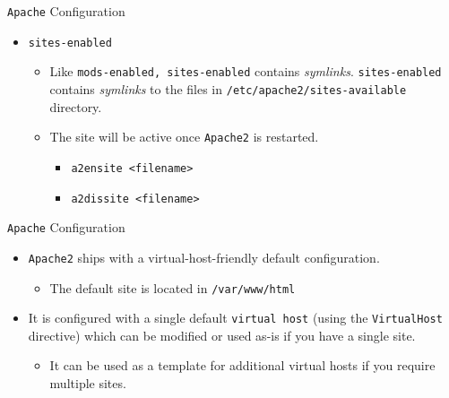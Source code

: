 \documentclass[xcolor=table]{beamer}
\begin{document}
\begin{frame}{\texttt{Apache} Configuration}
  \begin{itemize}
    \item \texttt{sites-enabled} 
      \begin{itemize}
        \item Like \texttt{mods-enabled, sites-enabled} contains \textit{symlinks}.  \texttt{sites-enabled} contains \textit{symlinks} to the files in \texttt{/etc/apache2/sites-available} directory. 
        \item The site will be active once \texttt{Apache2} is restarted.
          \begin{itemize}
            \item \texttt{a2ensite \textless filename\textgreater}
            \item \texttt{a2dissite \textless filename\textgreater}
          \end{itemize}
      \end{itemize}
  \end{itemize}
\end{frame}

\begin{frame}{\texttt{Apache} Configuration}
  \begin{itemize}
    \item \texttt{Apache2} ships with a virtual-host-friendly default configuration. 
      \begin{itemize}
        \item The default site is located in \texttt{/var/www/html}
      \end{itemize}
    \item It is configured with a single default \texttt{virtual host} (using the \texttt{VirtualHost} directive) which can be modified or used as-is if you have a single site.
      \begin{itemize}
        \item It can be used as a template for additional virtual hosts if you require multiple sites. 
      \end{itemize}
  \end{itemize}
\end{frame}
\end{document}
